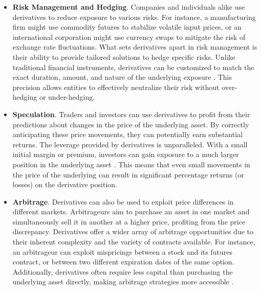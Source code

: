 \begin{itemize}
    \item \textbf{Risk Management and Hedging}. Companies and individuals alike use derivatives to reduce exposure to various risks. For instance, a manufacturing firm might use commodity futures to stabilize volatile input prices, or an international corporation might use currency swaps to mitigate the risk of exchange rate fluctuations. What sets derivatives apart in risk management is their ability to provide tailored solutions to hedge specific risks. Unlike traditional financial instruments, derivatives can be customized to match the exact duration, amount, and nature of the underlying exposure \citep{hammoudeh2013risk}. This precision allows entities to effectively neutralize their risk without over-hedging or under-hedging.

    \item \textbf{Speculation}. Traders and investors can use derivatives to profit from their predictions about changes in the price of the underlying asset. By correctly anticipating these price movements, they can potentially earn substantial returns. The leverage provided by derivatives is unparalleled. With a small initial margin or premium, investors can gain exposure to a much larger position in the underlying asset \citep{bartram2019corporate}. This means that even small movements in the price of the underlying can result in significant percentage returns (or losses) on the derivative position.

    \item \textbf{Arbitrage}. Derivatives can also be used to exploit price differences in different markets. Arbitrageurs aim to purchase an asset in one market and simultaneously sell it in another at a higher price, profiting from the price discrepancy. Derivatives offer a wider array of arbitrage opportunities due to their inherent complexity and the variety of contracts available. For instance, an arbitrageur can exploit mispricings between a stock and its futures contract, or between two different expiration dates of the same option. Additionally, derivatives often require less capital than purchasing the underlying asset directly, making arbitrage strategies more accessible \citep{panayides2006arbitrage}.
\end{itemize}